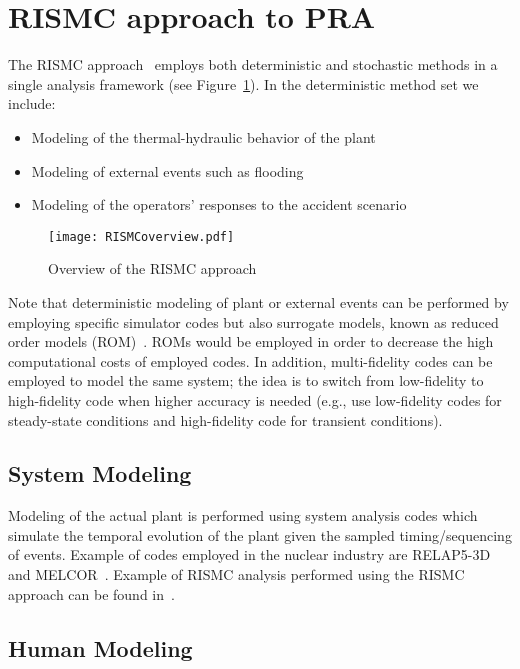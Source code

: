 \section{RISMC approach to PRA}
\label{sec:rismc}
The RISMC approach~\cite{RISMC} employs both deterministic and stochastic methods 
in a single analysis framework (see Figure~\ref{fig:RISMCoverview}). In the deterministic method 
set we include:
\begin{itemize}
  \item Modeling of the thermal-hydraulic behavior of the plant~\cite{BWR_SBO_Mandelli,BWRanalysis}
  \item Modeling of external events such as flooding~\cite{mandelliPSA2015}
  \item Modeling of the operators’ responses to the accident scenario~\cite{HRA_BoringReport2014}
\end{itemize}

\begin{figure}
    \centering
    \texttt{[image: RISMCoverview.pdf]}
    \caption{Overview of the RISMC approach}
    \label{fig:RISMCoverview}
\end{figure}

Note that deterministic modeling of plant or external events can be performed by employing 
specific simulator codes but also surrogate models, known as reduced order models (ROM)~\cite{ROM_Khalik}. 
ROMs would be employed in order to decrease the high computational costs of employed codes.
In addition, multi-fidelity codes can be employed to model the same system; the idea is to 
switch from low-fidelity to high-fidelity code when higher accuracy is needed (e.g., use 
low-fidelity codes for steady-state conditions and high-fidelity code for transient conditions).

\subsection{System Modeling}

Modeling of the actual plant is performed using system analysis codes which simulate the temporal 
evolution of the plant given the sampled timing/sequencing of events. Example of codes employed 
in the nuclear industry are RELAP5-3D~\cite{relap5} and MELCOR~\cite{Melcor}. 
Example of RISMC analysis performed using the RISMC approach can be 
found in~\cite{BWR_SBO_Mandelli,BWRanalysis,PRA_comparison_PSA2015}.

\subsection{Human Modeling}

